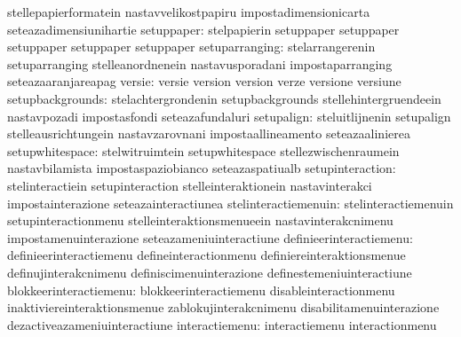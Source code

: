                                   stellepapierformatein            nastavvelikostpapiru
                                  impostadimensionicarta           seteazadimensiunihartie
setuppaper: stelpapierin  setuppaper
            setuppaper    setuppaper
            setuppaper    setuppaper
                  setuparranging: stelarrangerenin                 setuparranging
                                  stelleanordnenein                nastavusporadani
                                  impostaparranging                seteazaaranjareapag
                          versie: versie                           version
                                  version                          verze
                                  versione                         versiune
                setupbackgrounds: stelachtergrondenin              setupbackgrounds
                                  stellehintergruendeein           nastavpozadi
                                  impostasfondi                    seteazafundaluri
                      setupalign: steluitlijnenin                  setupalign
                                  stelleausrichtungein             nastavzarovnani
                                  impostaallineamento              seteazaalinierea
                 setupwhitespace: stelwitruimtein                  setupwhitespace
                                  stellezwischenraumein            nastavbilamista
                                  impostaspaziobianco              seteazaspatiualb
                setupinteraction: stelinteractiein                 setupinteraction
                                  stelleinteraktionein             nastavinterakci
                                  impostainterazione               seteazainteractiunea
            stelinteractiemenuin: stelinteractiemenuin             setupinteractionmenu
                                  stelleinteraktionsmenueein       nastavinterakcnimenu
                                  impostamenuinterazione           seteazameniuinteractiune
         definieerinteractiemenu: definieerinteractiemenu          defineinteractionmenu
                                  definiereinteraktionsmenue       definujinterakcnimenu
                                  definiscimenuinterazione         definestemeniuinteractiune
          blokkeerinteractiemenu: blokkeerinteractiemenu           disableinteractionmenu
                                  inaktiviereinteraktionsmenue     zablokujinterakcnimenu
                                  disabilitamenuinterazione        dezactiveazameniuinteractiune
                  interactiemenu: interactiemenu                   interactionmenu
